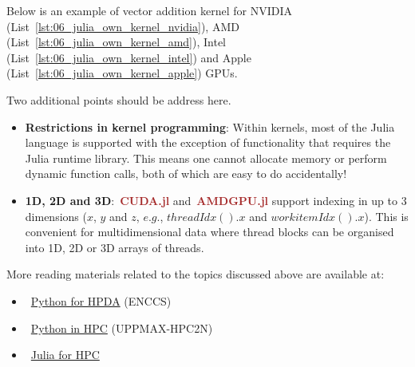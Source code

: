 \par
Below is an example of vector addition kernel for NVIDIA (List~\ref{lst:06_julia_own_kernel_nvidia}), AMD (List~\ref{lst:06_julia_own_kernel_amd}), Intel (List~\ref{lst:06_julia_own_kernel_intel}) and Apple (List~\ref{lst:06_julia_own_kernel_apple}) GPUs.














\par
Two additional points should be address here.
\begin{itemize}
    \item \textbf{Restrictions in kernel programming}: Within kernels, most of the Julia language is supported with the exception of functionality that requires the Julia runtime library. This means one cannot allocate memory or perform dynamic function calls, both of which are easy to do accidentally!
    \item \textbf{1D, 2D and 3D}:~\textbf{\textcolor{brown}{CUDA.jl}} and~\textbf{\textcolor{brown}{AMDGPU.jl}} support indexing in up to 3 dimensions ($x$, $y$ and $z$, $e.g.$, $threadIdx().x$ and $workitemIdx().x$). This is convenient for multidimensional data where thread blocks can be organised into 1D, 2D or 3D arrays of threads.
\end{itemize}


\par
More reading materials related to the topics discussed above are available at:
\begin{itemize}
    \item~\href{https://enccs.github.io/hpda-python/parallel-computing/}{Python for HPDA} (ENCCS)
    \item~\href{https://uppmax.github.io/HPC-python/}{Python in HPC} (UPPMAX-HPC2N)
    \item~\href{https://enccs.github.io/julia-for-hpc/}{Julia for HPC}
\end{itemize}

